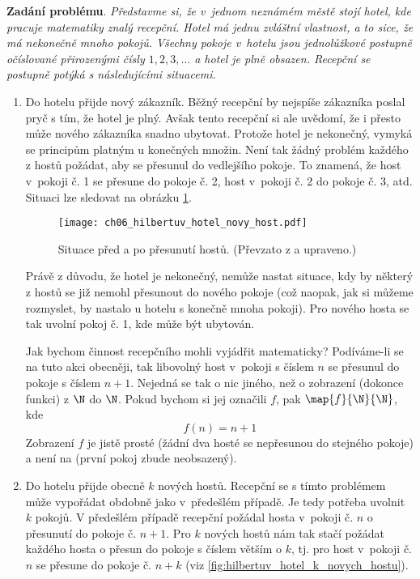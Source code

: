 \noindent\textbf{Zadání problému}. \textit{Představme si, že v~jednom neznámém městě stojí hotel, kde pracuje matematiky znalý recepční. Hotel má jednu zvláštní vlastnost, a to sice, že má nekonečně mnoho pokojů. Všechny pokoje v~hotelu jsou jednolůžkové postupně očíslované přirozenými čísly $1,2,3,\dots$ a hotel je plně obsazen. Recepční se postupně potýká s následujícími situacemi.}
\begin{enumerate}[label=\textit{(\roman*)}]
    \item\label{item:novy_host} Do hotelu přijde nový zákazník. Běžný recepční by nejspíše zákazníka poslal pryč s tím, že hotel je plný. Avšak tento recepční si ale uvědomí, že i přesto může nového zákazníka snadno ubytovat. Protože hotel je nekonečný, vymyká se principům platným u konečných množin. Není tak žádný problém každého z hostů požádat, aby se přesunul do vedlejšího pokoje. To znamená, že host v~pokoji č. 1 se přesune do pokoje č. 2, host v~pokoji č. 2 do pokoje č. 3, atd. Situaci lze sledovat na obrázku \ref{fig:hilbertuv_hotel_novy_host}.
    \begin{figure}[h]
        \centering
        \texttt{[image: ch06\_hilbertuv\_hotel\_novy\_host.pdf]}
        \caption{Situace před a po přesunutí hostů. (Převzato z \cite{Rmoutil2022} a upraveno.)}
        \label{fig:hilbertuv_hotel_novy_host}
    \end{figure}
    Právě z důvodu, že hotel je nekonečný, nemůže nastat situace, kdy by některý z hostů se již nemohl přesunout do nového pokoje (což naopak, jak si můžeme rozmyslet, by nastalo u hotelu s konečně mnoha pokoji). Pro nového hosta se tak uvolní pokoj č. 1, kde může být ubytován.\par
    Jak bychom činnost recepčního mohli vyjádřit matematicky? Podíváme-li se na tuto akci obecněji, tak libovolný host v~pokoji s číslem $n$ se přesunul do pokoje s číslem $n+1$. Nejedná se tak o nic jiného, než o zobrazení (dokonce funkci) z $\N$ do $\N$. Pokud bychom si jej označili $f$, pak $\map{f}{\N}{\N}$, kde
    \begin{equation*}
        f(n)=n+1
    \end{equation*}
    Zobrazení $f$ je jistě prosté (žádní dva hosté se nepřesunou do stejného pokoje) a není na (první pokoj zbude neobsazený).
    \item\label{item:k_novych_hostu} Do hotelu přijde obecně $k$ nových hostů. Recepční se s tímto problémem může vypořádat obdobně jako v~předešlém případě. Je tedy potřeba uvolnit $k$ pokojů. V předešlém případě recepční požádal hosta v~pokoji č. $n$ o přesunutí do pokoje č. $n+1$. Pro $k$ nových hostů nám tak stačí požádat každého hosta o přesun do pokoje s číslem větším o $k$, tj. pro host v~pokoji č. $n$ se přesune do pokoje č. $n+k$ (viz \ref{fig:hilbertuv_hotel_k_novych_hostu}).

\end{enumerate}
